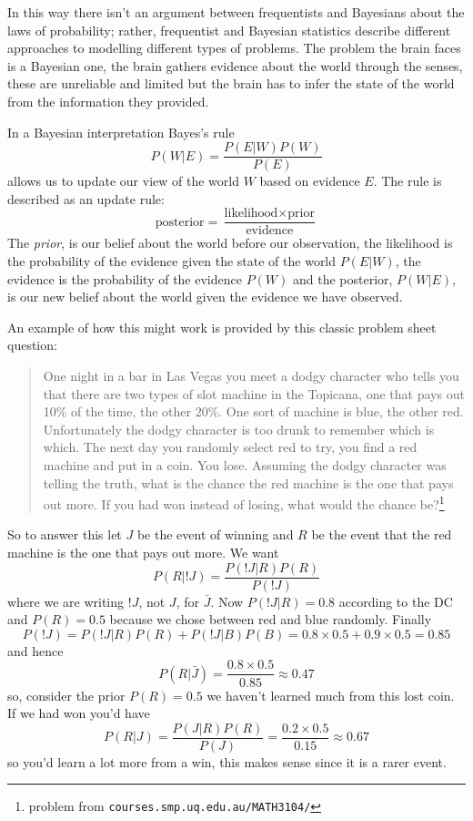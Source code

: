 \documentclass[12pt]{article}
\begin{document}
In this way there isn't an argument between frequentists and Bayesians
about the laws of probability; rather, frequentist and Bayesian
statistics describe different approaches to modelling different types
of problems. The problem the brain faces is a Bayesian one, the brain
gathers evidence about the world through the senses, these are
unreliable and limited but the brain has to infer the state of the
world from the information they provided.

In a Bayesian interpretation Bayes's rule 
\begin{equation}
P(W|E)=\frac{P(E|W)P(W)}{P(E)}
\end{equation}
allows us to update our view of the world $W$ based on evidence $E$. The rule is described as an update rule:
\begin{equation}
\mbox{posterior}=\frac{\mbox{likelihood}\times \mbox{prior}}{\mbox{evidence}}
\end{equation}
The \textsl{prior}, is our belief about the world before our
observation, the likelihood is the probability of the evidence given
the state of the world $P(E|W)$, the evidence is the probability of
the evidence $P(W)$ and the posterior, $P(W|E)$, is our new belief
about the world given the evidence we have observed.

An example of how this might work is provided by this classic problem sheet question:
\begin{quote}
One night in a bar in Las Vegas you meet a dodgy character who
  tells you that there are two types of slot machine in the Topicana,
  one that pays out 10\% of the time, the other 20\%. One sort of
  machine is blue, the other red. Unfortunately the dodgy character is
  too drunk to remember which is which. The next day you randomly
  select red to try, you find a red machine and put in a coin. You
  lose. Assuming the dodgy character was telling the truth, what is
  the chance the red machine is the one that pays out more. If you had
  won instead of losing, what would the chance be?\footnote{problem from \texttt{courses.smp.uq.edu.au/MATH3104/}}
\end{quote}
So to answer this let $J$ be the event of winning and $R$ be the event
that the red machine is the one that pays out more. We want
\begin{equation}
P(R|!J)=\frac{P(!J|R)P(R)}{P(!J)}
\end{equation}
where we are writing $!J$, not $J$, for $\bar{J}$. Now $P(!J|R)=0.8$
according to the DC and $P(R)=0.5$ because we chose between red and
blue randomly. Finally
\begin{equation}
P(!J)=P(!J|R)P(R)+P(!J|B)P(B)=0.8\times 0.5 + 0.9\times 0.5=0.85
\end{equation}
and hence
\begin{equation}
P(R|\bar{J})=\frac{0.8\times 0.5}{0.85}\approx0.47
\end{equation}
so, consider the prior $P(R)=0.5$ we haven't learned much from this lost coin. If we had won you'd have
\begin{equation}
P(R|J)=\frac{P(J|R)P(R)}{P(J)}=\frac{0.2\times 0.5}{0.15}\approx 0.67
\end{equation}
so you'd learn a lot more from a win, this makes sense since it is a rarer event.
\end{document}
